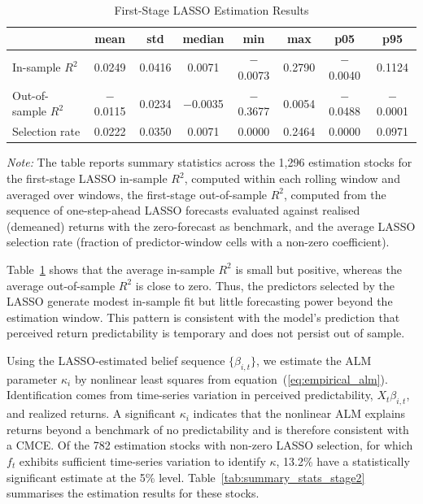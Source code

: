 \begin{table}[H]
\centering
\caption{First-Stage LASSO Estimation Results}
\label{tab:summary_stats_lasso}

\begin{tabularx}{\textwidth}{@{}>{{\small}}Xccccccc@{}}
\toprule
 & mean & std & median & min & max & p05 & p95 \\
\midrule
In-sample $R^2$   & 0.0249 & 0.0416 & 0.0071 & $-$0.0073 & 0.2790 & $-$0.0040 & 0.1124 \\
Out-of-sample $R^2$ & $-$0.0115 & 0.0234 & $-$0.0035 & $-$0.3677 & 0.0054 & $-$0.0488 & $-$0.0001 \\
Selection rate    & 0.0222 & 0.0350 & 0.0071 & 0.0000 & 0.2464 & 0.0000 & 0.0971 \\
\bottomrule
\end{tabularx}
\medskip
\begin{minipage}{\textwidth}
\footnotesize
\textit{Note:} The table reports summary statistics across the 1,296 estimation stocks for the first-stage LASSO in-sample $R^2$, computed within each rolling window and averaged over windows, the first-stage out-of-sample $R^2$, computed from the sequence of one-step-ahead LASSO forecasts evaluated against realised (demeaned) returns with the zero-forecast as benchmark, and the average LASSO selection rate (fraction of predictor-window cells with a non-zero coefficient).
\end{minipage}
\end{table}



Table~\ref{tab:summary_stats_lasso} shows that the average in-sample $R^2$ is small but positive, whereas the average out-of-sample $R^2$ is close to zero. Thus, the predictors selected by the LASSO generate modest in-sample fit but little forecasting power beyond the estimation window. This pattern is consistent with the model's prediction that perceived return predictability is temporary and does not persist out of sample.

Using the LASSO-estimated belief sequence $\{\beta_{i,t}\}$, we estimate the ALM parameter $\kappa_i$ by nonlinear least squares from equation~(\ref{eq:empirical_alm}). Identification comes from time-series variation in perceived predictability, $X_t\beta_{i,t}$, and realized returns. A significant $\kappa_i$ indicates that the nonlinear ALM explains returns beyond a benchmark of no predictability and is therefore consistent with a CMCE. Of the 782 estimation stocks with non-zero LASSO selection, for which $f_t$ exhibits sufficient time-series variation to identify $\kappa$, 13.2\% have a statistically significant estimate at the 5\% level.
Table~\ref{tab:summary_stats_stage2} summarises the estimation results for these stocks.

